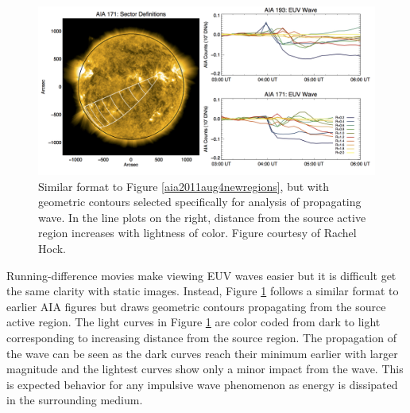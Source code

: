 \begin{figure}[!h]
    \begin{center}
	    \includegraphics[width=166mm]{Images/Aia2011Aug4Wave.png}
    \end{center}
    \caption[AIA wave analysis for 2011 August 4 event]{
        Similar format to Figure \ref{aia2011aug4newregions}, but with geometric contours selected specifically for analysis 
        of propagating wave. In the line plots on the right, distance from the source active region increases with lightness
        of color. Figure courtesy of Rachel Hock. 
	}
    \label{aia2011aug4wave}
\end{figure}

Running-difference movies make viewing EUV waves easier but it is difficult get the same clarity with static images. Instead, Figure \ref{aia2011aug4wave} follows a similar format to earlier AIA figures but draws geometric contours propagating from the source active region. The light curves in Figure \ref{aia2011aug4wave} are color coded from dark to light corresponding to increasing distance from the source region. The propagation of the wave can be seen as the dark curves reach their minimum earlier with larger magnitude and the lightest curves show only a minor impact from the wave. This is expected behavior for any impulsive wave phenomenon as energy is dissipated in the surrounding medium. 

